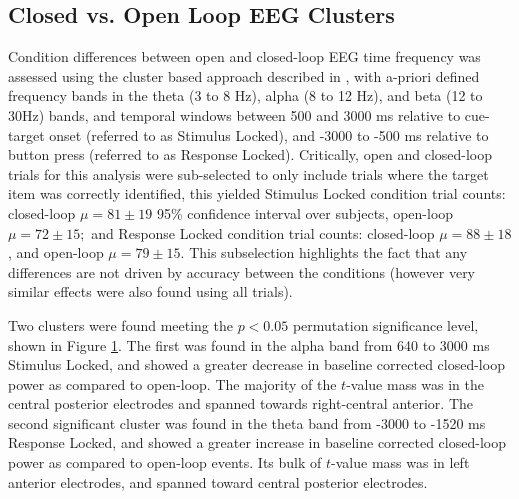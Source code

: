 \documentclass[11pt, titlepage, twoside]{article}
\providecommand{\DIFaddendFL}{} %
\begin{document}
\begin{figure}
{{		}\DIFaddendFL %
	}
	\label{fig:deevPowerClusters}
\end{figure}

\subsection{Closed vs. Open Loop EEG Clusters}
\label{sec:deevCLvOL}
Condition differences between open and closed-loop EEG time frequency was assessed using the cluster based approach described in \textcite{MarisOostenveld07}, with a-priori defined frequency bands in the theta (3 to 8 Hz), alpha (8 to 12 Hz), and beta (12 to 30Hz) bands, and temporal windows between 500 and 3000 ms relative to cue-target onset (referred to as Stimulus Locked), and -3000 to -500 ms relative to button press (referred to as Response Locked).  Critically, open and closed-loop trials for this analysis were sub-selected to only include trials where the target item was correctly identified, this yielded Stimulus Locked condition trial counts: closed-loop $\mu=81\pm19$ 95\% confidence interval over subjects, open-loop $\mu=72\pm15;$ and Response Locked condition trial counts: closed-loop $\mu=88\pm18$, and open-loop $\mu=79\pm15$.  This subselection highlights the fact that any differences are not driven by accuracy between the conditions (however very similar effects were also found using all trials). 

Two clusters were found meeting the $p<0.05$ permutation significance level, shown in Figure \ref{fig:deevPowerClusters}.  The first was found in the alpha band from 640 to 3000 ms Stimulus Locked, and showed a greater decrease in baseline corrected closed-loop power as compared to open-loop.  The majority of the $t$-value mass was in the central posterior electrodes and spanned towards right-central anterior.  The second significant cluster was found in the theta band from -3000 to -1520 ms Response Locked, and showed a greater increase in baseline corrected closed-loop power as compared to open-loop events.  Its bulk of $t$-value mass was in left anterior electrodes, and spanned toward central posterior electrodes. 
\end{document}
